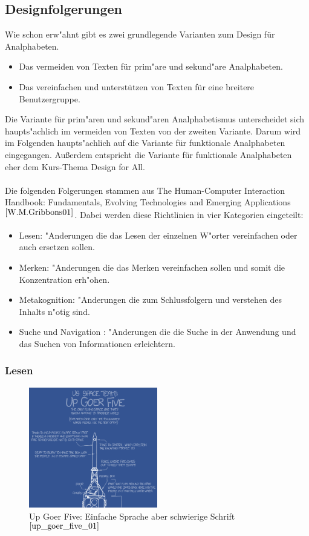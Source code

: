 \subsection{ Designfolgerungen}\label{sec:designClue}
Wie schon erw"ahnt gibt es zwei grundlegende Varianten zum Design für Analphabeten.
\begin{itemize}
\item Das vermeiden von Texten für  prim"are und sekund"are Analphabeten.
\item Das vereinfachen und unterstützen von Texten für eine breitere Benutzergruppe.
\end{itemize}
Die Variante für prim"aren und sekund"aren Analphabetismus unterscheidet sich haupts"achlich im vermeiden von Texten von der zweiten Variante. Darum wird im Folgenden haupts"achlich auf die Variante für funktionale Analphabeten eingegangen.
Außerdem entspricht die Variante für funktionale Analphabeten eher dem Kurs-Thema \glqq Design for All\grqq .\\\\

Die folgenden Folgerungen stammen aus \glqq The Human-Computer Interaction Handbook: Fundamentals, Evolving Technologies and Emerging Applications \grqq $^{\ref{W.M.Gribbons01}}$. Dabei werden diese Richtlinien in vier Kategorien eingeteilt:\\

\begin{itemize}
\item Lesen:              "Anderungen die das Lesen der einzelnen W"orter vereinfachen oder auch ersetzen sollen.
\item Merken:            "Anderungen die das Merken vereinfachen sollen und somit die Konzentration erh"ohen.
\item Metakognition: "Anderungen die zum Schlussfolgern und verstehen des Inhalts n"otig sind.
\item Suche und Navigation : "Anderungen die die Suche in der Anwendung und das Suchen von Informationen erleichtern.
\end{itemize}

\subsubsection{Lesen}\label{sec:designClueReading}
\begin{figure}[h]
	\centering
		\includegraphics[width=0.50\textwidth]{Daten/up_goer_five_part.png}
	\caption{Up Goer Five: Einfache Sprache aber schwierige Schrift $^{\ref{up_goer_five_01}}$}
	\label{fig:GoerFive}
\end{figure}

